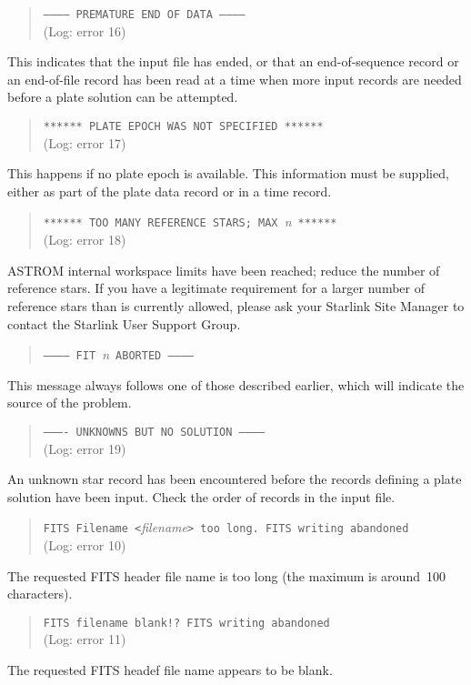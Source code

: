 \documentclass[twoside,11pt]{article}
\renewcommand{\_}{\texttt{\symbol{95}}}
\begin{document}
\begin{quote}
\texttt{------------ PREMATURE END OF DATA ------------}\\
(Log: error 16)
\end{quote}
This indicates that the input file has ended, or that an
end-of-sequence record or an end-of-file record has been read at a time
when more input records are needed before a plate solution can be
attempted.

\begin{quote}
\texttt{****** PLATE EPOCH WAS NOT SPECIFIED ******}\\
(Log: error 17)
\end{quote}
This happens if no plate epoch is available.  This
information must be supplied, either as part of the plate data record or
in a time record.

\begin{quote}
\texttt{****** TOO MANY REFERENCE STARS; MAX }\textit{n}\ \texttt{******}\\
(Log: error 18)
\end{quote}
ASTROM internal workspace limits have been reached;  reduce the
number of reference stars.  If you have a legitimate requirement
for a larger number of reference stars than is currently allowed,
please ask your Starlink Site Manager to contact the Starlink
User Support Group.

\begin{quote}
\texttt{------------ FIT }\textit{n}\ \texttt{ABORTED ------------}
\end{quote}
This message always follows one of those described earlier,
which will indicate the source of the problem.

\begin{quote}
\texttt{---------- UNKNOWNS BUT NO SOLUTION ------------}\\
(Log: error 19)
\end{quote}
An unknown star record has been encountered before the records defining
a plate solution have been input.  Check the order of records in the
input file.

\begin{quote}
\texttt{FITS Filename <}\textit{filename}\texttt{> too long.  FITS writing abandoned}\\
(Log: error 10)
\end{quote}
The requested FITS header file name is too long (the maximum is
around~100 characters).

\begin{quote}
\texttt{FITS filename blank!?  FITS writing abandoned}\\
(Log: error 11)
\end{quote}
The requested FITS headef file name appears to be blank.
\end{document}
